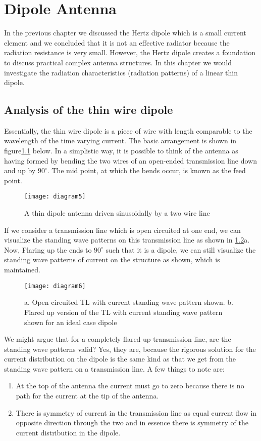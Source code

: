 \chapter{Dipole Antenna}
In the previous chapter we discussed the Hertz dipole which is a small current element and we concluded that it is not an effective radiator because the radiation resistance is very small. However, the Hertz dipole creates a foundation to discuss practical complex antenna structures. In this chapter we would investigate the radiation characteristics (radiation patterns) of a linear thin dipole. 

\section{Analysis of the thin wire dipole}
Essentially, the thin wire dipole is a piece of wire with length comparable to the wavelength of the time varying current. The basic arrangement is shown in figure\ref{figure1} below. In a simplistic way, it is possible to think of the antenna as having formed by bending the two wires of an open-ended transmission line down and up by $90^\circ$. The mid point, at which the bends occur, is known as the feed point. 

\begin{figure}
	\centering
	\texttt{[image: diagram5]}
	\caption{A thin dipole antenna driven sinusoidally by a two wire line}
	\label{figure1}
\end{figure}

If we consider a transmission line which is open circuited at one end, we can visualize the standing wave patterns on this transmission line as shown in \ref{figure2}a. Now, Flaring up the ends to $90^\circ$ such that it is a dipole, we can still visualize the standing wave patterns of current on the structure as shown, which is maintained. 
\begin{figure}
	\centering
	\texttt{[image: diagram6]}
	\caption{a. Open circuited TL with current standing wave pattern shown.           
     b. Flared up version of the TL with current standing wave pattern shown for an ideal case dipole}
	\label{figure2}
\end{figure}

We might argue that for a completely flared up transmission line, are the standing wave patterns valid? Yes, they are, because the rigorous solution for the current distribution on the dipole is the same kind as that we get from the standing wave pattern on a transmission line. A few things to note are:
\begin{enumerate}
	\item{} 
	  At the top of the antenna the current must go to zero because there is no path for the current at the tip of the antenna.
	\item{} 
	  There is symmetry of current in the transmission line as equal current flow in opposite direction through the two and in essence there is symmetry of the current distribution in the dipole. 
\end{enumerate}

